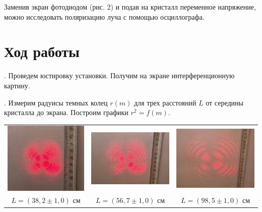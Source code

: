 \documentclass[a4paper,12pt]{article} %
\begin{document}
\medskip

\noindent Заменив экран фотодиодом (рис. 2) и подав на кристалл переменное напряжение, можно исследовать поляризацию луча с помощью осциллографа.

\section{Ход работы}

. Проведем юстировку установки. Получим на экране интерференционную картину.

\medskip

. Измерим радуисы темных колец $r(m)$ для трех расстояний $L$ от середины кристалла до экрана. Построим графики $r^2 = f(m)$.

\medskip

\begin{table}[h!]
\begin{tabular}{lll}
\includegraphics[width=0.3\linewidth]{l1.jpg} & \includegraphics[width=0.3\linewidth]{l2.jpg} & \includegraphics[width=0.3\linewidth]{l3.jpg} \\
\multicolumn{1}{c}{$L = (38,2 \pm 1,0) \text{ см}$} & \multicolumn{1}{c}{$L = (56,7 \pm 1,0) \text{ см}$} & \multicolumn{1}{c}{$L = (98,5 \pm 1,0) \text{ см}$}
\end{tabular}
\end{table}

\medskip
\end{document}
